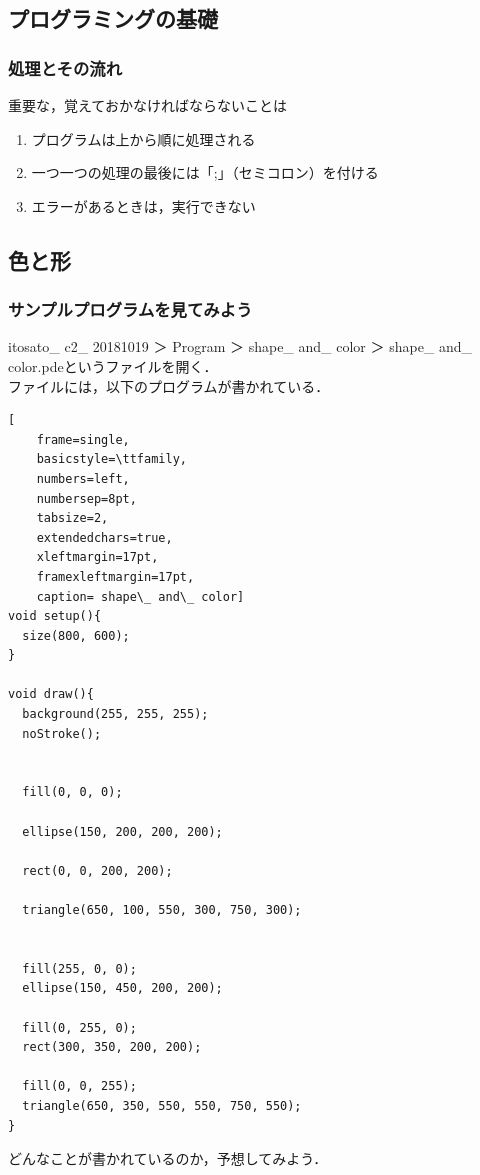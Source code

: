 \documentclass[a4j]{jarticle}
\begin{document}
\subsection{プログラミングの基礎}
\subsubsection{処理とその流れ}
重要な，覚えておかなければならないことは
\begin{enumerate}
\item プログラムは上から順に処理される
\item 一つ一つの処理の最後には「;」（セミコロン）を付ける
\item エラーがあるときは，実行できない
\end{enumerate}


\subsection{色と形}
\subsubsection{サンプルプログラムを見てみよう}
itosato\_ c2\_ 20181019 ＞ Program ＞ shape\_ and\_ color ＞ shape\_ and\_ color.pdeというファイルを開く．\\
ファイルには，以下のプログラムが書かれている．

\begin{lstlisting}[
	frame=single, 
	basicstyle=\ttfamily, 
	numbers=left, 
	numbersep=8pt, 
	tabsize=2,
	extendedchars=true, 
	xleftmargin=17pt, 
	framexleftmargin=17pt, 
	caption= shape\_ and\_ color]
void setup(){
  size(800, 600); 
}

void draw(){
  background(255, 255, 255);
  noStroke();
  

  fill(0, 0, 0);
  
  ellipse(150, 200, 200, 200);
  
  rect(0, 0, 200, 200);
  
  triangle(650, 100, 550, 300, 750, 300);
  
   
  fill(255, 0, 0);
  ellipse(150, 450, 200, 200);
  
  fill(0, 255, 0);
  rect(300, 350, 200, 200);
  
  fill(0, 0, 255);
  triangle(650, 350, 550, 550, 750, 550);  
}
\end{lstlisting}
どんなことが書かれているのか，予想してみよう．
\\
\\
\\
\\
\\
\\
\\
\end{document}
